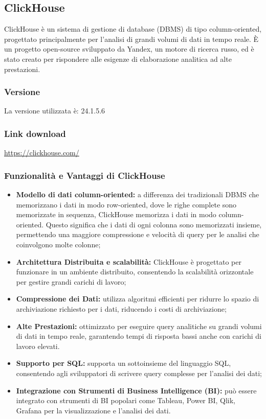 \subsection{ClickHouse} \label{sec:clickHouse}
ClickHouse è un sistema di gestione di database (DBMS) di tipo column-oriented, progettato principalmente per l'analisi di grandi volumi di dati in tempo reale. È un progetto open-source sviluppato da Yandex, un motore di ricerca russo, ed è stato creato per rispondere alle esigenze di elaborazione analitica ad alte prestazioni.
\subsubsection{Versione}
La versione utilizzata è: 24.1.5.6
\subsubsection{Link download}
\href{https://clickhouse.com/}{https://clickhouse.com/}

\subsubsection{Funzionalità e Vantaggi di ClickHouse}
\begin{itemize}
    \item \textbf{ Modello di dati column-oriented:} a differenza dei tradizionali DBMS che memorizzano i dati in modo row-oriented, dove le righe complete sono memorizzate in sequenza, ClickHouse memorizza i dati in modo column-oriented. Questo significa che i dati di ogni colonna sono memorizzati insieme, permettendo una maggiore compressione e velocità di query per le analisi che coinvolgono molte colonne;
    \item \textbf{Architettura Distribuita e scalabilità:} ClickHouse è progettato per funzionare in un ambiente distribuito, consentendo la scalabilità orizzontale per gestire grandi carichi di lavoro;
    \item \textbf{Compressione dei Dati:} utilizza algoritmi efficienti per ridurre lo spazio di archiviazione richiesto per i dati, riducendo i costi di archiviazione;
    \item \textbf{Alte Prestazioni:} ottimizzato per eseguire query analitiche su grandi volumi di dati in tempo reale, garantendo tempi di risposta bassi anche con carichi di lavoro elevati.
    \item \textbf{Supporto per SQL:} supporta un sottoinsieme del linguaggio SQL, consentendo agli sviluppatori di scrivere query complesse per l'analisi dei dati;
    \item \textbf{Integrazione con Strumenti di Business Intelligence (BI):} può essere integrato con strumenti di BI popolari come Tableau, Power BI, Qlik, Grafana per la visualizzazione e l'analisi dei dati.
\end{itemize}


